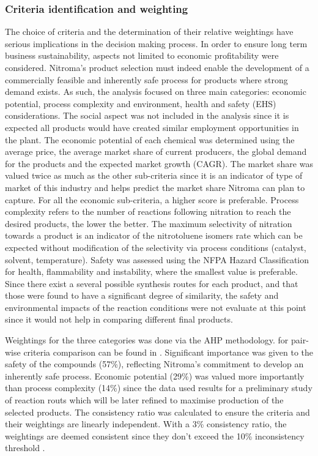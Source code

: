 \subsubsection{Criteria identification and weighting}

The choice of criteria and the determination of their relative weightings have serious implications in the decision making process. In order to ensure long term business sustainability, aspects not limited to economic profitability were considered. Nitroma's product selection must indeed enable the development of a commercially feasible and inherently safe process for products where strong demand exists. As such, the analysis focused on three main categories: economic potential, process complexity and environment, health and safety (EHS) considerations. The social aspect was not included in the analysis since it is expected all products would have created similar employment opportunities in the plant. 
The economic potential of each chemical was determined using the average price, the average market share of current producers, the global demand for the products and the expected market growth (CAGR). The market share was valued twice as much as the other sub-criteria since it is an indicator of type of market of this industry and helps predict the market share Nitroma can plan to capture. For all the economic sub-criteria, a higher score is preferable. Process complexity refers to the number of reactions following nitration to reach the desired products, the lower the better. The maximum selectivity of nitration towards a product is an indicator of the nitrotoluene isomers rate which can be expected without modification of the selectivity via process conditions (catalyst, solvent, temperature). Safety was assessed using the NFPA Hazard Classification for health, flammability and instability, where the smallest value is preferable. Since there exist a several possible synthesis routes for each product, and that those were found to have a significant degree of similarity, the safety and environmental impacts of the reaction conditions were not evaluate at this point since it would not help in comparing different final products. 

Weightings for the three categories was done via the AHP methodology.  for pair-wise criteria comparison can be found in . Significant importance was given to the safety of the compounds (57\%), reflecting Nitroma's commitment to develop an inherently safe process. Economic potential (29\%) was valued more importantly than process complexity (14\%) since the data used results for a preliminary study of reaction routs which will be later refined to maximise production of the selected products. The consistency ratio was calculated to ensure the criteria and their weightings are linearly independent. With a 3\% consistency ratio, the weightings are deemed consistent since they don't exceed the 10\% inconsistency threshold \cite{saaty_analytic_1987}.


